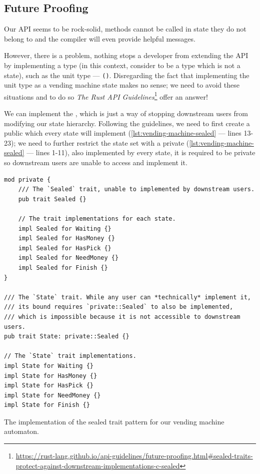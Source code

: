 \subsection{Future Proofing}\label{sec:typestates-hard-way:future}

Our \gls{API} seems to be rock-solid,
methods cannot be called in state they do not belong to and the compiler will even provide helpful messages.

However, there is a problem, nothing stops a developer from extending the \gls{API} by implementing a  type
(in this context, consider  to be a type which is not a state), such as the unit type --- \texttt{()}.
Disregarding the fact that implementing the unit type as a vending machine state makes no sense;
we need to avoid these situations and to do so \emph{The Rust API Guidelines}\footnote{\url{https://rust-lang.github.io/api-guidelines/future-proofing.html\#sealed-traits-protect-against-downstream-implementations-c-sealed}} offer an answer! %

We can implement the ,
which is just a way of stopping downstream users from modifying our state hierarchy.
Following the guidelines, we need to first create a public  which every state will implement (\autoref{lst:vending-machine-sealed} --- lines 13-23);
we need to further restrict the state set with a private  (\autoref{lst:vending-machine-sealed} --- lines 1-11), also implemented by every state,
it is required to be private so downstream users are unable to access and implement it.

\begin{listing}
    \begin{verbatim}
mod private {
    /// The `Sealed` trait, unable to implemented by downstream users.
    pub trait Sealed {}

    // The trait implementations for each state.
    impl Sealed for Waiting {}
    impl Sealed for HasMoney {}
    impl Sealed for HasPick {}
    impl Sealed for NeedMoney {}
    impl Sealed for Finish {}
}

/// The `State` trait. While any user can *technically* implement it,
/// its bound requires `private::Sealed` to also be implemented,
/// which is impossible because it is not accessible to downstream users.
pub trait State: private::Sealed {}

// The `State` trait implementations.
impl State for Waiting {}
impl State for HasMoney {}
impl State for HasPick {}
impl State for NeedMoney {}
impl State for Finish {}
\end{verbatim}
    \caption{The implementation of the sealed trait pattern for our vending machine automaton.}
    \label{lst:vending-machine-sealed}
\end{listing}


